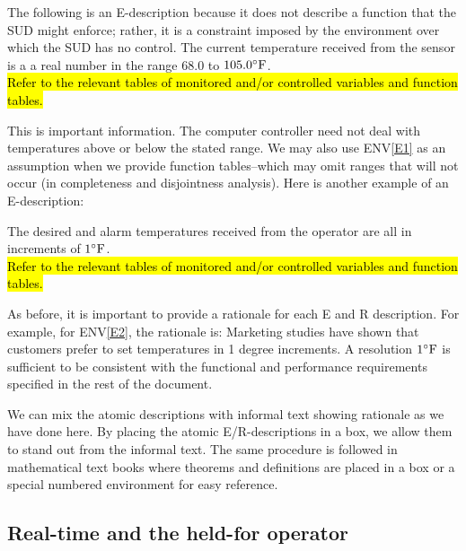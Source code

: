 The following is an E-description because it does not describe a function that the SUD might enforce; rather, it is a constraint imposed by the environment over which the SUD has no control. 
{The current temperature received from the sensor is a a real number in the range $68.0$ to $105.0 ^{\circ}\mathrm{F}$.\\}
{\hl{Refer to the relevant tables of monitored and/or controlled variables and function tables.}}
\label{E1}

This is important information. The computer controller need not deal with temperatures above or below the stated range. We may also use ENV\ref{E1} as an assumption  when we provide function tables--which may omit ranges that will not occur (in completeness and disjointness analysis). Here is another example of an E-description:

{The desired and alarm temperatures received from the operator are all in increments of $1 ^{\circ}\mathrm{F}$.\\}
{\hl{Refer to the relevant tables of monitored and/or controlled variables and function tables.}}
\label{E2}

As before, it is important to provide a rationale for each E and R description. For example, for ENV\ref{E2}, the rationale is: Marketing studies have shown that customers prefer to set temperatures in 1 degree increments. A resolution $1^{\circ}\mathrm{F}$ is sufficient to be consistent with the functional and performance requirements specified in the rest of the document. 

We can mix the atomic descriptions with informal text showing rationale as we have done here. By placing the atomic E/R-descriptions in a box, we allow them to stand out from the informal text. The same procedure is followed in mathematical text books where theorems and definitions are placed in a box or a special numbered environment for easy reference.

\subsection{Real-time and the held-for operator}

